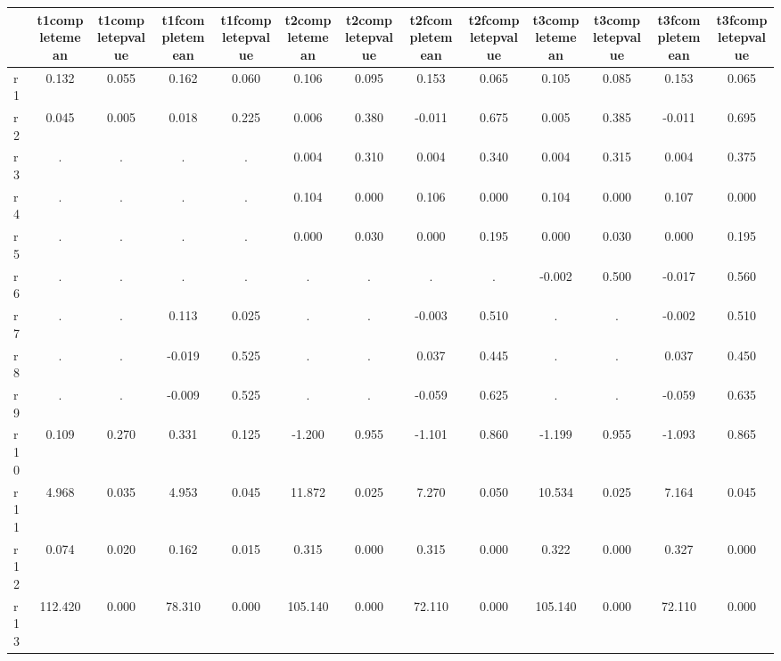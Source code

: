 \begin{table}[htbp]
\begin{tabular}{lcccccccccccc} \hline \hline
 & t1completemean  & t1completepvalue  & t1fcompletemean  & t1fcompletepvalue  & t2completemean  & t2completepvalue  & t2fcompletemean  & t2fcompletepvalue  & t3completemean  & t3completepvalue  & t3fcompletemean  & t3fcompletepvalue  \\  \hline 
r1 &     0.132 &     0.055 &     0.162 &     0.060 &     0.106 &     0.095 &     0.153 &     0.065 &     0.105 &     0.085 &     0.153 &     0.065 \\  
r2 &     0.045 &     0.005 &     0.018 &     0.225 &     0.006 &     0.380 &    -0.011 &     0.675 &     0.005 &     0.385 &    -0.011 &     0.695 \\  
r3 &         . &         . &         . &         . &     0.004 &     0.310 &     0.004 &     0.340 &     0.004 &     0.315 &     0.004 &     0.375 \\  
r4 &         . &         . &         . &         . &     0.104 &     0.000 &     0.106 &     0.000 &     0.104 &     0.000 &     0.107 &     0.000 \\  
r5 &         . &         . &         . &         . &     0.000 &     0.030 &     0.000 &     0.195 &     0.000 &     0.030 &     0.000 &     0.195 \\  
r6 &         . &         . &         . &         . &         . &         . &         . &         . &    -0.002 &     0.500 &    -0.017 &     0.560 \\  
r7 &         . &         . &     0.113 &     0.025 &         . &         . &    -0.003 &     0.510 &         . &         . &    -0.002 &     0.510 \\  
r8 &         . &         . &    -0.019 &     0.525 &         . &         . &     0.037 &     0.445 &         . &         . &     0.037 &     0.450 \\  
r9 &         . &         . &    -0.009 &     0.525 &         . &         . &    -0.059 &     0.625 &         . &         . &    -0.059 &     0.635 \\  
r10 &     0.109 &     0.270 &     0.331 &     0.125 &    -1.200 &     0.955 &    -1.101 &     0.860 &    -1.199 &     0.955 &    -1.093 &     0.865 \\  
r11 &     4.968 &     0.035 &     4.953 &     0.045 &    11.872 &     0.025 &     7.270 &     0.050 &    10.534 &     0.025 &     7.164 &     0.045 \\  
r12 &     0.074 &     0.020 &     0.162 &     0.015 &     0.315 &     0.000 &     0.315 &     0.000 &     0.322 &     0.000 &     0.327 &     0.000 \\  
r13 &   112.420 &     0.000 &    78.310 &     0.000 &   105.140 &     0.000 &    72.110 &     0.000 &   105.140 &     0.000 &    72.110 &     0.000 \\  
\hline \hline \end{tabular}
\end{table}
